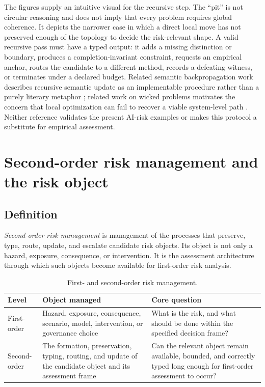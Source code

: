 \documentclass[11pt]{article}
\begin{document}
The figures supply an intuitive visual for the recursive step. The ``pit'' is not circular reasoning and does not imply that every problem requires global coherence. It depicts the narrower case in which a direct local move has not preserved enough of the topology to decide the risk-relevant shape. A valid recursive pass must have a typed output: it adds a missing distinction or boundary, produces a completion-invariant constraint, requests an empirical anchor, routes the candidate to a different method, records a defeating witness, or terminates under a declared budget. Related semantic backpropagation work describes recursive semantic update as an implementable procedure rather than a purely literary metaphor \cite{williams2025semantic}; related work on wicked problems motivates the concern that local optimization can fail to recover a viable system-level path \cite{williams2023wicked}. Neither reference validates the present AI-risk examples or makes this protocol a substitute for empirical assessment.

\section{Second-order risk management and the risk object}

\label{sec:second-order}

\subsection{Definition}

\emph{Second-order risk management} is management of the processes that preserve, type, route, update, and escalate candidate risk objects. Its object is not only a hazard, exposure, consequence, or intervention. It is the assessment architecture through which such objects become available for first-order risk analysis.

\begin{table}[htbp]
\centering
\caption{First- and second-order risk management.}
\label{tab:first-second}
\begin{tabularx}{\textwidth}{>{\raggedright\arraybackslash}p{}p{}X}
\toprule
Level & Object managed & Core question \\
\midrule
First-order & Hazard, exposure, consequence, scenario, model, intervention, or governance choice & What is the risk, and what should be done within the specified decision frame? \\
Second-order & The formation, preservation, typing, routing, and update of the candidate object and its assessment frame & Can the relevant object remain available, bounded, and correctly typed long enough for first-order assessment to occur? \\
\bottomrule
\end{tabularx}
\end{table}
\end{document}
